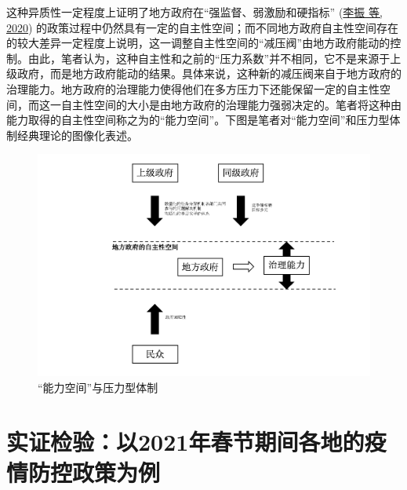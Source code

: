 \documentclass[
  12pt,
]{ctexart}
\begin{document}
这种异质性一定程度上证明了地方政府在``强监督、弱激励和硬指标'' (\protect\hyperlink{ref-LiZhenEtAl2020}{李振 等, 2020}) 的政策过程中仍然具有一定的自主性空间；而不同地方政府自主性空间存在的较大差异一定程度上说明，这一调整自主性空间的``减压阀''由地方政府能动的控制。由此，笔者认为，这种自主性和之前的``压力系数''并不相同，它不是来源于上级政府，而是地方政府能动的结果。具体来说，这种新的减压阀来自于地方政府的治理能力。地方政府的治理能力使得他们在多方压力下还能保留一定的自主性空间，而这一自主性空间的大小是由地方政府的治理能力强弱决定的。笔者将这种由能力取得的自主性空间称之为的``能力空间''。下图是笔者对``能力空间''和压力型体制经典理论的图像化表述。

\begin{figure}
\includegraphics[width=1\linewidth]{../figures/figure2} \caption{“能力空间”与压力型体制}\label{fig:unnamed-chunk-1}
\end{figure}

\hypertarget{ux5b9eux8bc1ux68c0ux9a8cux4ee52021ux5e74ux6625ux8282ux671fux95f4ux5404ux5730ux7684ux75abux60c5ux9632ux63a7ux653fux7b56ux4e3aux4f8b}{%
\section{实证检验：以2021年春节期间各地的疫情防控政策为例}\label{ux5b9eux8bc1ux68c0ux9a8cux4ee52021ux5e74ux6625ux8282ux671fux95f4ux5404ux5730ux7684ux75abux60c5ux9632ux63a7ux653fux7b56ux4e3aux4f8b}}
\end{document}
